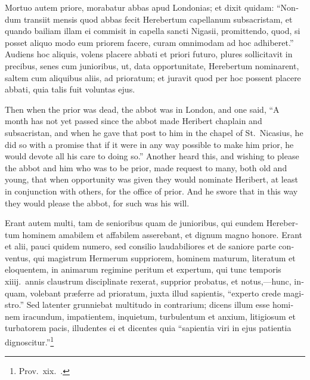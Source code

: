 \documentclass[10pt]{book}
\begin{document}
\begin{paracol}{2}
\switchcolumn*

\begin{otherlanguage}{latin}
Mortuo autem priore, morabatur abbas apud Londonias; et dixit quidam: ``Nondum transiit mensis quod abbas fecit Herebertum capellanum subsacristam, et quando bailiam illam ei commisit in capella sancti Nigasii, promittendo, quod, si posset aliquo modo eum priorem facere, curam omnimodam ad hoc adhiberet.'' Audiens hoc aliquis, volens placere abbati et priori futuro, plures sollicitavit in precibus, senes cum junioribus, ut, data opportunitate, Herebertum nominarent, saltem cum aliquibus aliis, ad prioratum; et juravit quod per hoc possent placere abbati, quia talis fuit voluntas ejus.
\end{otherlanguage}

\switchcolumn

Then when the prior was dead, the abbot was in London, and one said, ``A month has not yet passed since the abbot made Heribert chaplain and subsacristan, and when he gave that post to him in the chapel of St.\ Nicasius, he did so with a promise that if it were in any way possible to make him prior, he would devote all his care to doing so.'' Another heard this, and wishing to please the abbot and him who was to be prior, made request to many, both old and young, that when opportunity was given they would nominate Heribert, at least in conjunction with others, for the office of prior. And he swore that in this way they would please the abbot, for such was his will.

\switchcolumn*

\begin{otherlanguage}{latin}
Erant autem multi, tam de senioribus quam de junioribus, qui eundem Herebertum hominem amabilem et affabilem asserebant, et dignum magno honore. Erant et alii, pauci quidem numero, sed consilio laudabiliores et de saniore parte conventus, qui magistrum Hermerum suppriorem, hominem maturum, literatum et eloquentem, in animarum regimine peritum et expertum, qui tunc temporis xiiij.\ annis claustrum disciplinate rexerat, supprior probatus, et notus,---hunc, inquam, volebant pr\ae{}ferre ad prioratum, juxta illud sapientis, ``experto crede magistro.'' Sed latenter grunniebat multitudo in contrarium; dicens illum esse hominem iracundum, impatientem, inquietum, turbulentum et anxium, litigiosum et turbatorem pacis, illudentes ei et dicentes quia ``sapientia viri in ejus patientia dignoscitur.''\footnote[\textdagger]{Prov.\ xix.\ .}
\end{otherlanguage}


\end{paracol}
\end{document}
